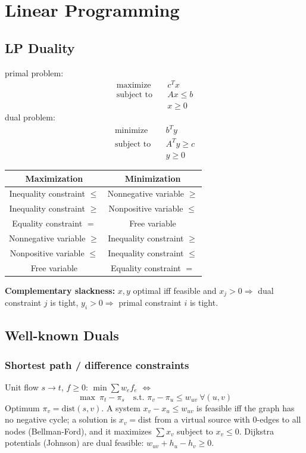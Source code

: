 \chapter{Linear Programming}

\section{LP Duality}

primal problem:
\[\begin{aligned}
\text{maximize} \quad & c^T x \\
\text{subject to} \quad & Ax \le b \\
& x \ge 0
\end{aligned}\]
dual problem:
\[\begin{aligned}
\text{minimize} \quad & b^T y \\
\text{subject to} \quad & A^T y \ge c \\
& y \ge 0
\end{aligned}\]

\begin{center}
\begin{tabular}{c|c}
Maximization & Minimization \\
\hline
Inequality constraint $\le$ & Nonnegative variable $\ge$ \\
Inequality constraint $\ge$ & Nonpositive variable $\le$ \\
Equality constraint $=$ & Free variable \\
Nonnegative variable $\ge$ & Inequality constraint $\ge$ \\
Nonpositive variable $\le$ & Inequality constraint $\le$ \\
Free variable & Equality constraint $=$ \\
\end{tabular}
\end{center}

\textbf{Complementary slackness:} $x, y$ optimal iff feasible and
$x_j > 0 \Rightarrow$ dual constraint $j$ is tight, $y_i > 0 \Rightarrow$ primal constraint $i$ is tight.

\section{Well-known Duals}
\subsection{Shortest path / difference constraints}
Unit flow $s \to t$, $f \ge 0$: $\min \sum w_e f_e$ $\Leftrightarrow$
\[ \max\ \pi_t - \pi_s \quad \text{s.t. } \pi_v - \pi_u \le w_{uv} \ \forall (u,v) \]
Optimum $\pi_v = \mathrm{dist}(s,v)$. A system $x_v - x_u \le w_{uv}$ is feasible iff the graph has no negative cycle; a solution is $x_v = \mathrm{dist}$ from a virtual source with $0$-edges to all nodes (Bellman-Ford), and it maximizes $\sum x_v$ subject to $x_v \le 0$.
Dijkstra potentials (Johnson) are dual feasible: $w_{uv} + h_u - h_v \ge 0$.

